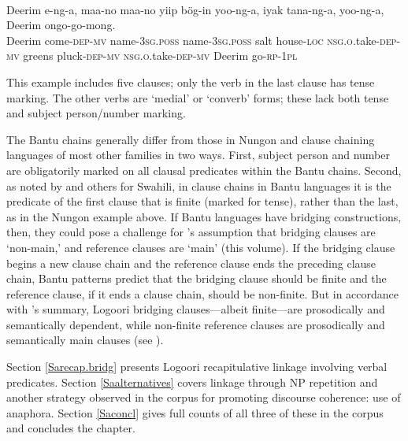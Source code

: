 \documentclass[output=paper]{LSP/langsci}
\begin{document}
\begin{exe}
	\ex	\label{Saex:1}
\\
\gll		Deerim e-ng-a, maa-no maa-no yiip bög-in yoo-ng-a, iyak tana-ng-a, yoo-ng-a, Deerim ongo-go-mong.\\
			Deerim come-\textsc{dep}-\textsc{mv} name-\textsc{3sg.poss} name-\textsc{3sg.poss} salt house-\textsc{loc} \textsc{nsg.o.}take\textsc{-dep}-\textsc{mv} greens pluck-\textsc{dep}-\textsc{mv } \textsc{nsg.o.}take\textsc{-dep}-\textsc{mv} Deerim go-\textsc{rp}-\textsc{1pl}\\
		\glt	{} \citep[][252]{Sarvasy2017}
\end{exe}

%

This example includes five clauses; only the verb in the last clause has tense marking. The other verbs are `medial' or `converb' forms; these lack both tense and subject person/number marking.

The Bantu chains generally differ from those in Nungon and clause chaining languages of most other families in two ways. First, subject person and number are obligatorily marked on all clausal predicates within the Bantu chains. Second, as noted by \citet{Haspelmath.1995} and others for Swahili, in clause chains in Bantu languages it is the predicate of the first clause that is finite (marked for tense), rather than the last, as in the Nungon example above. If Bantu languages have bridging constructions, then, they could pose a challenge for \citeauthor{guerin18}’s assumption that bridging clauses are ‘non-main,’ and reference clauses are ‘main’ (this volume). If the bridging clause begins a new clause chain and the reference clause ends the preceding clause chain, Bantu patterns predict that the bridging clause should be finite and the reference clause, if it ends a clause chain, should be non-finite. But in accordance with \citeauthor{guerin18}’s summary, Logoori bridging clauses—albeit finite—are prosodically and semantically dependent, while non-finite reference clauses are prosodically and semantically main clauses (see ). 

Section \ref{Sarecap.bridg} presents Logoori recapitulative linkage involving verbal predicates. Section \ref{Saalternatives} covers linkage through NP repetition and another strategy observed in the corpus for promoting discourse coherence: use of anaphora. Section \ref{Saconcl} gives full counts of all three of these in the corpus and concludes the chapter.
\end{document}
